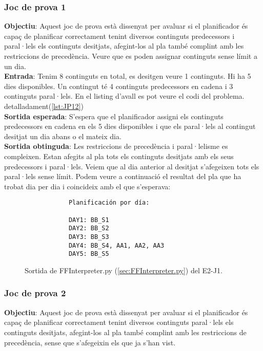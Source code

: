 \documentclass[a4paper]{article}
\begin{document}
	\subsubsection*{Joc de prova 1}
	\noindent \textbf{Objectiu}: Aquest joc de prova està dissenyat per avaluar si el planificador és capaç de planificar correctament tenint diversos continguts predecessors i paral·lels els continguts desitjats, afegint-los al pla també complint amb les restriccions de precedència. Veure que es poden assignar continguts sense límit a un dia. \\
	
	\noindent \textbf{Entrada}: Tenim 8 continguts en total, es desitgen veure 1 continguts. Hi ha 5 dies disponibles. Un contingut té 4 continguts predecessors en cadena i 3 continguts paral·lels. En el listing d'avall es pot veure el codi del problema.  detalladament(\ref{lst:JP12}) \\
	
	\noindent \textbf{Sortida esperada}: S'espera que el planificador assigni els continguts predecessors en cadena en els 5 dies disponibles i que els paral·lels al contingut desitjat un dia abans o el mateix dia. \\
	
	\noindent \textbf{Sortida obtinguda}: Les restriccions de precedència i paral·lelisme es compleixen.  Estan afegits al pla tots els continguts desitjats amb els seus predecessors i paral·lels. Veiem que al dia anterior al desitjat s'afegeixen tots els paral·lels sense límit. Podem veure a continuació el resultat del pla que ha trobat dia per dia i coincideix amb el que s'esperava:
	
	\begin{figure}[H]
		\centering
		\begin{verbatim}
			Planificación por día:
			
			DAY1: BB_S1
			DAY2: BB_S2
			DAY3: BB_S3
			DAY4: BB_S4, AA1, AA2, AA3
			DAY5: BB_S5
		\end{verbatim}
		\caption{Sortida de FFInterpreter.py (\ref{sec:FFInterpreter.py}) del E2-J1.}
	\end{figure}
	
	\subsubsection*{Joc de prova 2}
	\noindent \textbf{Objectiu}: Aquest joc de prova està dissenyat per avaluar si el planificador és capaç de planificar correctament tenint diversos continguts paral·lels els continguts desitjats, afegint-los al pla també complint amb les restriccions de precedència, sense que s'afegeixin els que ja s'han vist. \\
	
\end{document}
